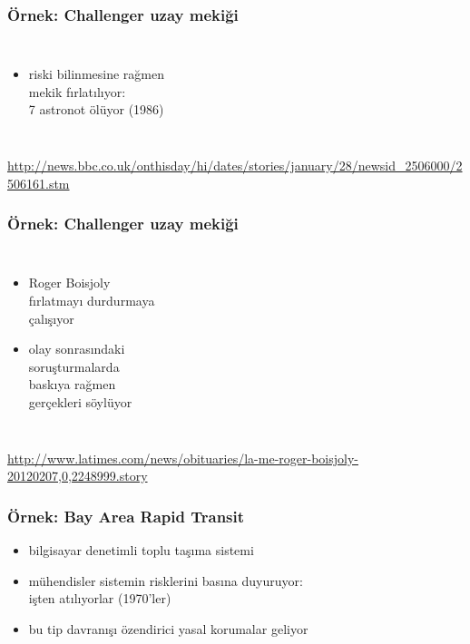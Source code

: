 \documentclass[dvipsnames]{beamer}
\theoremstyle{definition}
\theoremstyle{example}
\theoremstyle{plain}
\begin{document}
\begin{frame}
  \frametitle{Örnek: Challenger uzay mekiği}

  \begin{columns}

    \begin{itemize}
      \item riski bilinmesine rağmen\\
        mekik fırlatılıyor:\\
        7 astronot ölüyor (1986)
    \end{itemize}
  \end{columns}

  \medskip
  \tiny{\url{http://news.bbc.co.uk/onthisday/hi/dates/stories/january/28/newsid_2506000/2506161.stm}}\\
\end{frame}

\begin{frame}
  \frametitle{Örnek: Challenger uzay mekiği}

  \begin{columns}

    \begin{itemize}
      \item Roger Boisjoly\\
        fırlatmayı durdurmaya\\
        çalışıyor
      \item olay sonrasındaki\\
        soruşturmalarda\\
        baskıya rağmen\\
        gerçekleri söylüyor
    \end{itemize}
  \end{columns}

  \medskip
  \tiny{\url{http://www.latimes.com/news/obituaries/la-me-roger-boisjoly-20120207,0,2248999.story}}\\
\end{frame}

\begin{frame}
  \frametitle{Örnek: Bay Area Rapid Transit}

  \begin{itemize}
    \item bilgisayar denetimli toplu taşıma sistemi
    \item mühendisler sistemin risklerini basına duyuruyor:\\
      işten atılıyorlar (1970'ler)

    \medskip
    \item bu tip davranışı özendirici yasal korumalar geliyor
  \end{itemize}
\end{frame}
\end{document}
